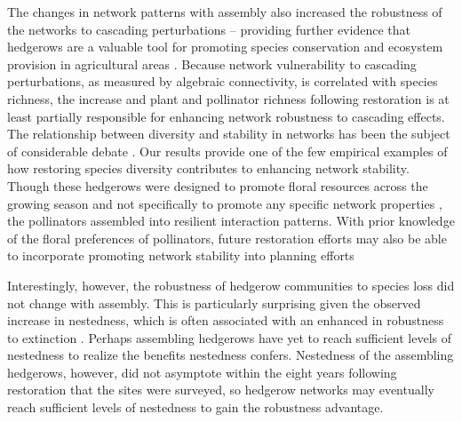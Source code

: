 \documentclass[12pt]{article}
\begin{document}
The changes in network patterns with assembly also increased the
robustness of the networks to cascading perturbations -- providing
further evidence that hedgerows are a valuable tool for promoting
species conservation and ecosystem provision in agricultural areas
\citep{mgonigle-2015-x, ponisio2015farm, kremen-2015-602}. Because
network vulnerability to cascading perturbations, as measured by
algebraic connectivity, is correlated with species richness, the
increase and plant and pollinator richness following restoration is at
least partially responsible for enhancing network robustness to
cascading effects. The relationship between diversity and stability in
networks has been the subject of considerable debate
\citep[e.g.,][]{may1972will, pimm1984complexity,
  montoya2006ecological}. Our results provide one of the few empirical
examples of how restoring species diversity contributes to enhancing
network stability. Though these hedgerows were designed to promote
floral resources across the growing season and not specifically to
promote any specific network properties \citep{menz-2010-4}, the
pollinators assembled into resilient interaction patterns. With prior
knowledge of the floral preferences of pollinators, future restoration
efforts may also be able to incorporate promoting network stability
into planning efforts \citep{mgonigle2016tool}

Interestingly, however, the robustness of hedgerow communities to
species loss did not change with assembly. This is particularly
surprising given the observed increase in nestedness, which is often
associated with an enhanced in robustness to extinction
\citep{Memmott2004}. Perhaps assembling hedgerows have yet to reach sufficient
levels of nestedness to realize the benefits nestedness
confers. Nestedness of the assembling hedgerows, however, did not
asymptote within the eight years following restoration that the sites
were surveyed, so hedgerow networks may eventually reach sufficient
levels of nestedness to gain the robustness advantage.
\end{document}
